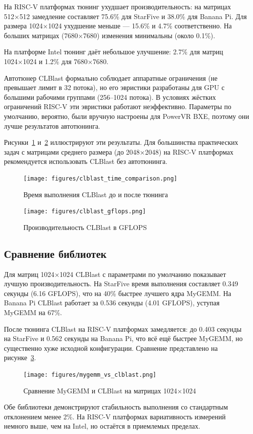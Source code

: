 На RISC-V платформах тюнинг ухудшает производительность: на матрицах 512×512 замедление составляет 75.6\% для StarFive и 38.0\% для Banana Pi. Для размера 1024×1024 ухудшение меньше --- 15.6\% и 4.7\% соответственно. На больших матрицах (7680×7680) изменения минимальны (около 0.1\%). 

На платформе Intel тюнинг даёт небольшое улучшение: 2.7\% для матриц 1024×1024 и 1.2\% для 7680×7680. 

Автотюнер CLBlast формально соблюдает аппаратные ограничения (не превышает лимит в 32 потока), но его эвристики разработаны для GPU с большими рабочими группами (256--1024 потока). В условиях жёстких ограничений RISC-V эти эвристики работают неэффективно. Параметры по умолчанию, вероятно, были вручную настроены для PowerVR BXE, поэтому они лучше результатов автотюнинга.

Рисунки~\ref{fig:clblast_time} и~\ref{fig:clblast_gflops} иллюстрируют эти результаты. Для большинства практических задач с матрицами среднего размера (до 2048×2048) на RISC-V платформах рекомендуется использовать CLBlast без автотюнинга.

\begin{figure}[h!]
\centering
\texttt{[image: figures/clblast\_time\_comparison.png]}
\caption{Время выполнения CLBlast до и после тюнинга}
\label{fig:clblast_time}
\end{figure}

\begin{figure}[h!]
\centering
\texttt{[image: figures/clblast\_gflops.png]}
\caption{Производительность CLBlast в GFLOPS}
\label{fig:clblast_gflops}
\end{figure}

\subsection{Сравнение библиотек}

Для матриц 1024×1024 CLBlast с параметрами по умолчанию показывает лучшую производительность. На StarFive время выполнения составляет 0.349 секунды (6.16 GFLOPS), что на 40\% быстрее лучшего ядра MyGEMM. На Banana Pi CLBlast работает за 0.536 секунды (4.01 GFLOPS), уступая MyGEMM на 67\%.

После тюнинга CLBlast на RISC-V платформах замедляется: до 0.403 секунды на StarFive и 0.562 секунды на Banana Pi, что всё ещё быстрее MyGEMM, но существенно хуже исходной конфигурации. Сравнение представлено на рисунке~\ref{fig:clblast_vs_mygemm}.

\begin{figure}[h!]
\centering
\texttt{[image: figures/mygemm\_vs\_clblast.png]}
\caption{Сравнение MyGEMM и CLBlast на матрицах 1024×1024}
\label{fig:clblast_vs_mygemm}
\end{figure}

Обе библиотеки демонстрируют стабильность выполнения со стандартным отклонением менее 2\%. На RISC-V платформах вариативность измерений немного выше, чем на Intel, но остаётся в приемлемых пределах.